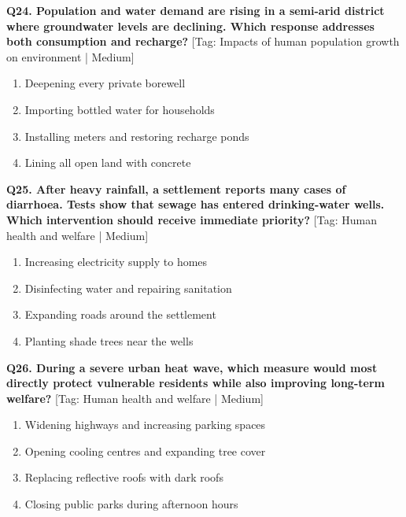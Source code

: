 \noindent\textbf{Q24. Population and water demand are rising in a semi-arid district where groundwater levels are declining. Which response addresses both consumption and recharge?} \hfill [Tag: Impacts of human population growth on environment | Medium]
\begin{enumerate}[label=(\alph*),topsep=2pt,itemsep=1pt,partopsep=0pt,parsep=0pt]
    \item {Deepening every private borewell}
    \item {Importing bottled water for households}
    \item {Installing meters and restoring recharge ponds}
    \item {Lining all open land with concrete}
\end{enumerate}
\vspace{2mm}

\noindent\textbf{Q25. After heavy rainfall, a settlement reports many cases of diarrhoea. Tests show that sewage has entered drinking-water wells. Which intervention should receive immediate priority?} \hfill [Tag: Human health and welfare | Medium]
\begin{enumerate}[label=(\alph*),topsep=2pt,itemsep=1pt,partopsep=0pt,parsep=0pt]
    \item {Increasing electricity supply to homes}
    \item {Disinfecting water and repairing sanitation}
    \item {Expanding roads around the settlement}
    \item {Planting shade trees near the wells}
\end{enumerate}
\vspace{2mm}

\noindent\textbf{Q26. During a severe urban heat wave, which measure would most directly protect vulnerable residents while also improving long-term welfare?} \hfill [Tag: Human health and welfare | Medium]
\begin{enumerate}[label=(\alph*),topsep=2pt,itemsep=1pt,partopsep=0pt,parsep=0pt]
    \item {Widening highways and increasing parking spaces}
    \item {Opening cooling centres and expanding tree cover}
    \item {Replacing reflective roofs with dark roofs}
    \item {Closing public parks during afternoon hours}
\end{enumerate}
\vspace{2mm}

